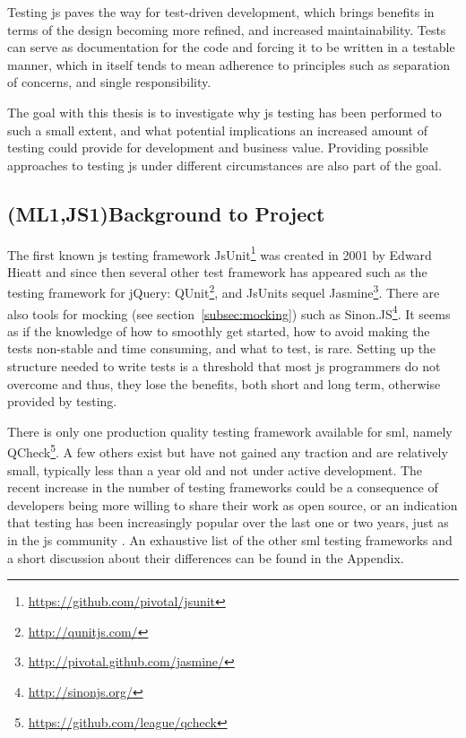 \documentclass[11pt]{article}
\begin{document}
Testing \gls{js} paves the way for test-driven development, which brings benefits in terms of the design becoming more refined, and increased maintainability. Tests can serve as documentation for the code and forcing it to be written in a testable manner, which in itself tends to mean adherence to principles such as separation of concerns, and single responsibility.

The goal with this thesis is to investigate why \gls{js} testing has been performed to such a small extent, and what potential implications an increased amount of testing could provide for development and business value. Providing possible approaches to testing \gls{js} under different circumstances are also part of the goal. %

\subsection{(ML1,JS1)Background to Project}

The first known \gls{js} testing framework JsUnit\footnote{\url{https://github.com/pivotal/jsunit}} was created in 2001 by Edward Hieatt \cite{GoingFaster} and since then several other test framework has appeared such as the testing framework for jQuery: QUnit\footnote{\url{http://qunitjs.com/}}, and JsUnits sequel Jasmine\footnote{\url{http://pivotal.github.com/jasmine/}}. There are also tools for mocking (see section~\ref{subsec:mocking}) such as Sinon.JS\footnote{\url{http://sinonjs.org/}}. It seems as if the knowledge of how to smoothly get started, how to avoid making the tests non-stable and time consuming, and what to test, is rare. Setting up the structure needed to write tests is a threshold that most \gls{js} programmers do not overcome \cite{TestingStatistics} and thus, they lose the benefits, both short and long term, otherwise provided by testing.

There is only one production quality testing framework available for \gls{sml}, namely QCheck\footnote{\url{https://github.com/league/qcheck}}. A few others exist but have not gained any traction and are relatively small, typically less than a year old and not under active development. The recent increase in the number of testing frameworks could be a consequence of developers being more willing to share their work as open source, or an indication that testing has been increasingly popular over the last one or two years, just as in the \gls{js} community \cite[question~1]{Edelstam}. An exhaustive list of the other \gls{sml} testing frameworks and a short discussion about their differences can be found in the Appendix.
\label{mltestingframeworks}
\end{document}
